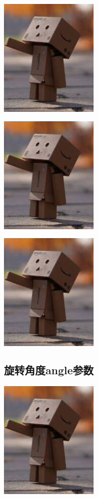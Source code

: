 \documentclass{article}
\begin{document}
	\includegraphics[height=0.25\textheight]{test.jpg}
	
	\includegraphics[height=0.5\textheight]{test.jpg}
	
	\includegraphics[height=1\textheight]{test.jpg}
	
	\subsection{旋转角度angle参数}
	\includegraphics[angle=90]{test.jpg}
	
\end{document}
